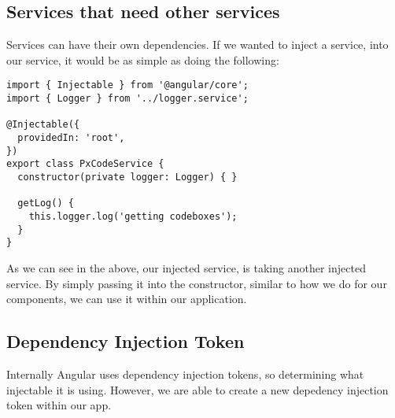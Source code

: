 \subsection{Services that need other services}
Services can have their own dependencies. If we wanted to inject a service, into
our service, it would be as simple as doing the following:
\begin{lstlisting}
import { Injectable } from '@angular/core';
import { Logger } from '../logger.service';

@Injectable({
  providedIn: 'root',
})
export class PxCodeService {
  constructor(private logger: Logger) { }

  getLog() {
    this.logger.log('getting codeboxes');
  }
}
\end{lstlisting}

As we can see in the above, our injected service, is taking another injected
service. By simply passing it into the constructor, similar to how we do for our
components, we can use it within our application.

\subsection{ Dependency Injection Token }
Internally Angular uses dependency injection tokens, so determining what
injectable it is using. However, we are able to create a new depedency injection
token within our app. 
